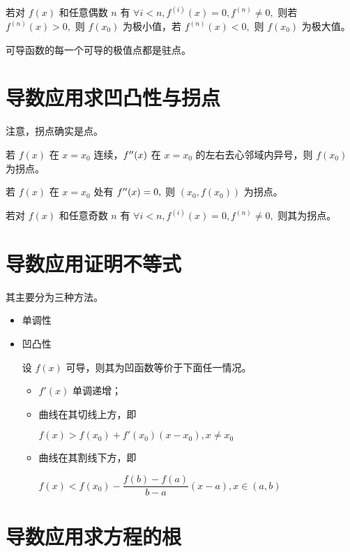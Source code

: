 若对 $ f(x) $ 和任意偶数 $ n $ 有 $ \forall i < n, f^{(i)}(x) = 0,f^{(n)} \neq 0, $ 
则若 $f^{(n)}(x)> 0, $ 则 $ f(x_0) $ 为极小值，若 $f^{(n)}(x)< 0, $ 则 $ f(x_0) $ 为极大值。


可导函数的每一个可导的极值点都是驻点。

\section{导数应用求凹凸性与拐点}

注意，拐点确实是点。


若 $ f(x) $ 在 $ x = x_0 $ 连续，$ f^{\prime\prime}(x) $ 在 $ x = x_0 $ 的左右去心邻域内异号，则 $ f(x_0) $ 为拐点。


若 $ f(x) $ 在 $ x = x_0 $ 处有 $ f^{\prime\prime}(x) = 0, $ 则 $ (x_0,f(x_0)) $ 为拐点。


若对 $ f(x) $ 和任意奇数 $ n $ 有 $ \forall i < n, f^{(i)}(x) = 0,f^{(n)} \neq 0, $ 
则其为拐点。

\section{导数应用证明不等式}

其主要分为三种方法。

\begin{itemize}
    \item 单调性
    \item 凹凸性
    
    设 $ f(x) $ 可导，则其为凹函数等价于下面任一情况。
    \begin{itemize}[topsep = 0pt]
        \item $ f'(x) $ 单调递增；
        \item 曲线在其切线上方，即
        
        $ f(x) > f(x_0) + f'(x_0)(x-x_0),x \neq x_0 $ 
        \item 曲线在其割线下方，即
        
        $ f(x) < f(x_0) - \dfrac{f(b)-f(a)}{b-a}(x-a), x\in (a,b) $ 
    \end{itemize}
\end{itemize}

\section{导数应用求方程的根}

